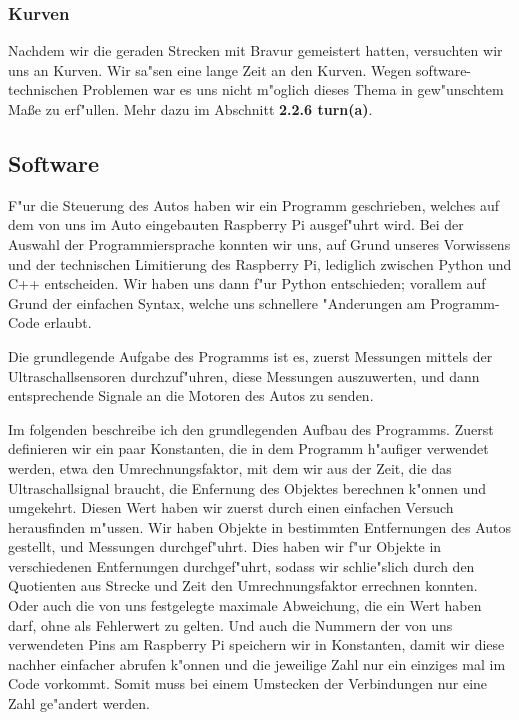 \documentclass[a4paper,12pt]{article}
\begin{document}
\subsubsection{Kurven}\label{sec2.1.6}

Nachdem wir die geraden Strecken mit Bravur gemeistert hatten, versuchten wir uns an Kurven.
Wir sa"sen eine lange Zeit an den Kurven.
Wegen software-technischen Problemen war es uns nicht m"oglich dieses Thema in gew"unschtem Maße zu erf"ullen. Mehr dazu im Abschnitt {\bf 2.2.6 turn(a)}.

\subsection{Software}\label{sec2.2}

F"ur die Steuerung des Autos haben wir ein Programm geschrieben, welches auf dem von uns im Auto eingebauten Raspberry Pi ausgef"uhrt wird.
Bei der Auswahl der Programmiersprache konnten wir uns, auf Grund unseres Vorwissens und der technischen Limitierung des Raspberry Pi, lediglich zwischen Python und C++ entscheiden.
Wir haben uns dann f"ur Python entschieden; vorallem auf Grund der einfachen Syntax, welche uns schnellere "Anderungen am Programm-Code erlaubt.

Die grundlegende Aufgabe des Programms ist es, zuerst Messungen mittels der Ultraschallsensoren durchzuf"uhren, diese Messungen auszuwerten, und dann entsprechende Signale an die Motoren des Autos zu senden.

\medskip

Im folgenden beschreibe ich den grundlegenden Aufbau des Programms.
Zuerst definieren wir ein paar Konstanten, die in dem Programm h"aufiger verwendet werden, etwa den Umrechnungsfaktor, mit dem wir aus der Zeit, die das Ultraschallsignal braucht, die Enfernung des Objektes berechnen k"onnen und umgekehrt.
Diesen Wert haben wir zuerst durch einen einfachen Versuch herausfinden m"ussen.
Wir haben Objekte in bestimmten Entfernungen des Autos gestellt, und Messungen durchgef"uhrt.
Dies haben wir f"ur Objekte in verschiedenen Entfernungen durchgef"uhrt, sodass wir schlie"slich durch den Quotienten aus Strecke und Zeit den Umrechnungsfaktor errechnen konnten.
Oder auch die von uns festgelegte maximale Abweichung, die ein Wert haben darf, ohne als Fehlerwert zu gelten.
Und auch die Nummern der von uns verwendeten Pins am Raspberry Pi speichern wir in Konstanten, damit wir diese nachher einfacher abrufen k"onnen und die jeweilige Zahl nur ein einziges mal im Code vorkommt.
Somit muss bei einem Umstecken der Verbindungen nur eine Zahl ge"andert werden.
\end{document}
